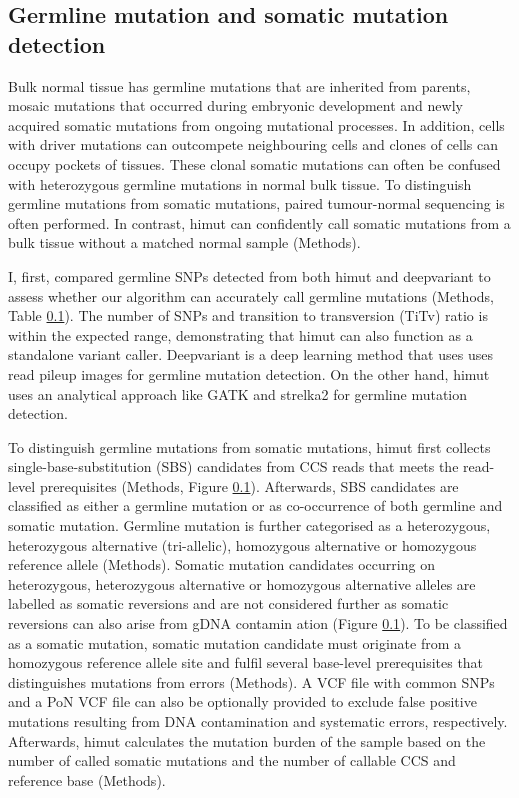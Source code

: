 \subsection{Germline mutation and somatic mutation detection}

Bulk normal tissue has germline mutations that are inherited from parents, mosaic mutations that occurred during embryonic development and newly acquired somatic mutations from ongoing mutational processes. In addition, cells with driver mutations can outcompete neighbouring cells and clones of cells can occupy pockets of tissues. These clonal somatic mutations can often be confused with heterozygous germline mutations in normal bulk tissue. To distinguish germline mutations from somatic mutations, paired tumour-normal sequencing is often performed. In contrast, himut can confidently call somatic mutations from a bulk tissue without a matched normal sample (Methods). 

I, first, compared germline SNPs detected from both himut and deepvariant to assess whether our algorithm can accurately call germline mutations (Methods, Table \ref{}). The number of SNPs and transition to transversion (TiTv) ratio is within the expected range, demonstrating that himut can also function as a standalone variant caller. Deepvariant is a deep learning method that uses uses read pileup images for germline mutation detection. On the other hand, himut uses an analytical approach like GATK and strelka2 \cite{DePristo2011-vf, Kim2018-qi}  for germline mutation detection.  

To distinguish germline mutations from somatic mutations, himut first collects single-base-substitution (SBS) candidates from CCS reads that meets the read-level prerequisites (Methods, Figure \ref{}). Afterwards, SBS candidates are classified as either a germline mutation or as co-occurrence of both germline and somatic mutation. Germline mutation is further categorised as a heterozygous, heterozygous alternative (tri-allelic), homozygous alternative or homozygous reference allele (Methods). Somatic mutation candidates occurring on heterozygous, heterozygous alternative or homozygous alternative alleles are labelled as somatic reversions and are not considered further as somatic reversions can also arise from gDNA contamin
ation (Figure \ref{}). To be classified as a somatic mutation, somatic mutation candidate must originate from a homozygous reference allele site and fulfil several base-level prerequisites that distinguishes mutations from errors (Methods). A VCF file with common SNPs and a PoN VCF file can also be optionally provided to exclude false positive mutations resulting from DNA contamination and systematic errors, respectively. Afterwards, himut calculates the mutation burden of the sample based on the number of called somatic mutations and the number of callable CCS and reference base (Methods). 

